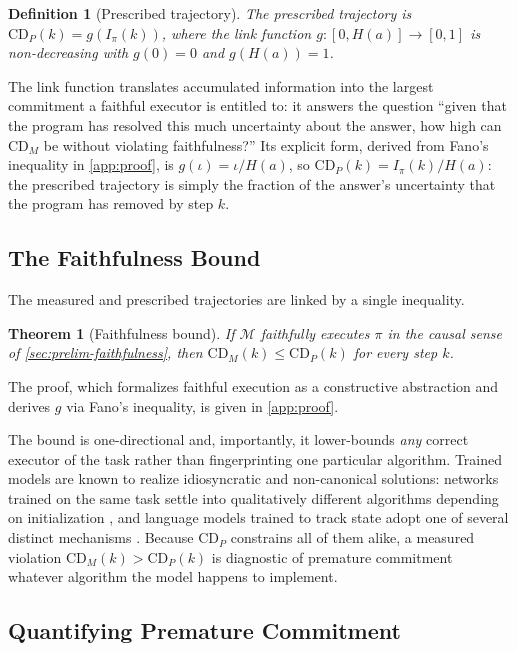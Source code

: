 \documentclass[11pt]{article}
\newtheorem{definition}{Definition}
\newtheorem{theorem}{Theorem}
\newcommand{\CDP}{\mathrm{CD}_{P}}
\newcommand{\CDM}{\mathrm{CD}_{M}}
\newcommand{\stepk}{k}
\begin{document}
\begin{definition}[Prescribed trajectory]
\label{def:cdp}
The \emph{prescribed trajectory} is $\CDP(\stepk)=g\!\left(I_{\pi}(\stepk)\right)$,
where the link function $g:[0,H(a)]\to[0,1]$ is non-decreasing with $g(0)=0$ and
$g(H(a))=1$.
\end{definition}

The link function translates accumulated information into the largest
commitment a faithful executor is entitled to: it answers the question ``given
that the program has resolved this much uncertainty about the answer, how high
can $\CDM$ be without violating faithfulness?'' Its explicit form, derived from
Fano's inequality in \cref{app:proof}, is $g(\iota)=\iota/H(a)$, so
$\CDP(\stepk)=I_{\pi}(\stepk)/H(a)$: the prescribed trajectory is simply the
fraction of the answer's uncertainty that the program has removed by step
$\stepk$.

\subsection{The Faithfulness Bound}
\label{sec:cd-bound}

The measured and prescribed trajectories are linked by a single inequality.

\begin{theorem}[Faithfulness bound]
\label{thm:bound}
If $\mathcal{M}$ faithfully executes $\pi$ in the causal sense of
\cref{sec:prelim-faithfulness}, then $\CDM(\stepk)\le\CDP(\stepk)$ for every
step $\stepk$.
\end{theorem}

\noindent The proof, which formalizes faithful execution as a constructive
abstraction and derives $g$ via Fano's inequality, is given in
\cref{app:proof}.

The bound is one-directional and, importantly, it lower-bounds \emph{any}
correct executor of the task rather than fingerprinting one particular
algorithm. Trained models are known to realize idiosyncratic and non-canonical
solutions: networks trained on the same task settle into qualitatively
different algorithms depending on initialization
\citep{DBLP:conf/nips/ZhongLTA23}, and language models trained to track state
adopt one of several distinct mechanisms \citep{DBLP:conf/icml/LiGA25}. Because
$\CDP$ constrains all of them alike, a measured violation
$\CDM(\stepk)>\CDP(\stepk)$ is diagnostic of premature commitment whatever
algorithm the model happens to implement.

\subsection{Quantifying Premature Commitment}
\label{sec:cd-functional}
\end{document}
